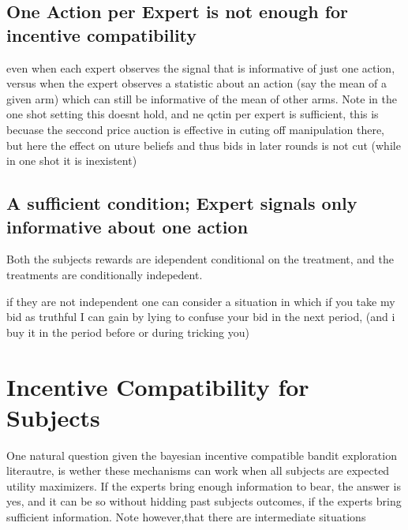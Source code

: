 \subsection{One Action per Expert is not enough for incentive compatibility}

even when each expert observes the signal that is informative of just one action, versus when the expert observes a statistic about an action (say the mean of a given arm) which can still be informative of the mean of other arms. Note in the one shot setting this doesnt hold, and ne qctin per expert is sufficient, this is becuase the seccond price auction is effective in cuting off manipulation there, but here the effect on uture beliefs and thus bids in later rounds is not cut (while in one shot it is inexistent)

\subsection{A sufficient condition; Expert signals only informative about one action}

Both the subjects rewards are idependent conditional on the treatment, and the treatments are conditionally indepedent.

if they are not independent one can consider a situation in which if you take my bid as truthful I can gain by lying to confuse your bid in the next period, (and i buy it in the period before or during tricking you)




\section{Incentive Compatibility for Subjects}

One natural question given the bayesian incentive compatible bandit exploration literautre, is wether these mechanisms can work when all subjects are expected utility maximizers. If the experts bring enough information to bear, the answer is yes, and it can be so without hidding past subjects outcomes, if the experts bring sufficient information. Note however,that there are intermediate situations 

